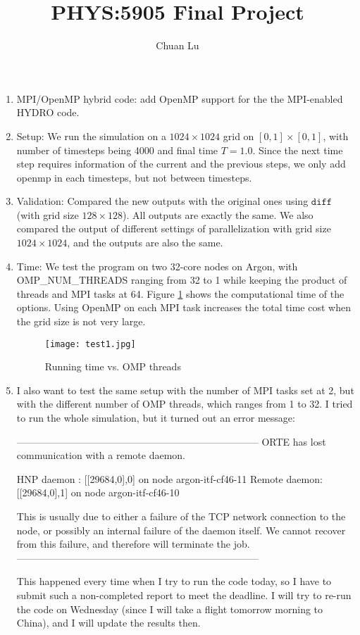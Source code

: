 \documentclass{article}
\begin{document}
\author{Chuan Lu}
\title{PHYS:5905 Final Project}
\maketitle

\medskip

\begin{enumerate}
\item MPI/OpenMP hybrid code: add OpenMP support for the the MPI-enabled HYDRO code.

\item Setup:
We run the simulation on a $1024\times 1024$ grid on $[0, 1]\times [0, 1]$, with number of timesteps being 4000 and final time $T = 1.0$. Since the next time step requires information of the current and the previous steps, we only add openmp in each timesteps, but not between timesteps.

\item Validation:
Compared the new outputs with the original ones using $\texttt{diff}$ (with grid size $128\times 128$). All outputs are exactly the same. We also compared the output of different settings of parallelization with grid size $1024\times 1024$, and the outputs are also the same.

\item Time: We test the program on two 32-core nodes on Argon, with OMP\_NUM\_THREADS ranging from 32 to 1 while keeping the product of threads and MPI tasks at 64. Figure \ref{1} shows the computational time of the options. Using OpenMP on each MPI task increases the total time cost when the grid size is not very large. 

\begin{figure}[h]
\centering
\texttt{[image: test1.jpg]}
\caption{Running time vs. OMP threads}
\label{1}
\end{figure}


\item 
I also want to test the same setup with the number of MPI tasks set at 2, but with the different number of OMP threads, which ranges from 1 to 32. I tried to run the whole simulation, but it turned out an error message:

--------------------------------------------------------------------------
ORTE has lost communication with a remote daemon.

  HNP daemon   : [[29684,0],0] on node argon-itf-cf46-11
  Remote daemon: [[29684,0],1] on node argon-itf-cf46-10

This is usually due to either a failure of the TCP network
connection to the node, or possibly an internal failure of
the daemon itself. We cannot recover from this failure, and
therefore will terminate the job.
--------------------------------------------------------------------------

This happened every time when I try to run the code today, so I have to submit such a non-completed report to meet the deadline. I will try to re-run the code on Wednesday (since I will take a flight tomorrow morning to China), and I will update the results then.


\end{enumerate}
\end{document}
